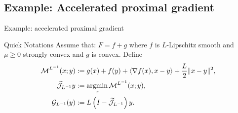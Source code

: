 \documentclass[11pt]{beamer}
\begin{document}
    \subsection{Example: Accelerated proximal gradient}
        \begin{frame}{Example: accelerated proximal gradient}
            \begin{block}{Quick Notations}
                Assume that: $F = f + g$ where $f$ is $L$-Lipschitz smooth and $\mu \ge 0$ strongly convex and $g$ is convex. 
                Define 
                \begin{align*}
                    \mathcal M^{L^{-1}}(x; y) 
                    &:= g(x) + f(y) 
                    + 
                    \left\langle \nabla f(x), x - y\right\rangle 
                    + 
                    \frac{L}{2}\Vert x - y\Vert^2, 
                    \\
                    \widetilde{\mathcal J}_{L^{-1}}y 
                    &:= \mathop{\rm argmin}\limits_{x} \mathcal M^{L^{-1}}(x; y), 
                    \\
                    \mathcal G_{L^{-1}}(y)
                    &:= L\left(I - \widetilde{\mathcal J}_{L^{-1}}\right)y. 
                \end{align*}

            \end{block}
        \end{frame}
        
\end{document}
